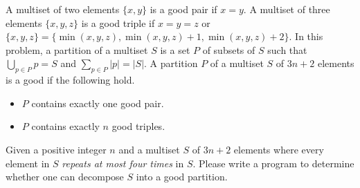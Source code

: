 A multiset of two elements $\{x, y\}$ is a good pair if $x=y$.
A multiset of three elements $\{x,y,z\}$ is a good triple 
if $x=y=z$ or $\{x,y,z\} = \{\min(x,y,z),\min(x,y,z)+1,\min(x,y,z)+2\}$.
In this problem, 
a partition of a multiset $S$ is a set $P$ of subsets of $S$ such that
$\bigcup_{p\in P}p = S$ and $\sum_{p\in P}|p| = |S|$.
A partition $P$ of a multiset $S$ of $3n+2$ elements is a good if 
the following hold.
\begin{itemize}
\item $P$ contains exactly one good pair.
\item $P$ contains exactly $n$ good triples.
\end{itemize}

Given a positive integer $n$ and a multiset $S$ of $3n+2$ elements where
every element in $S$ \emph{repeats at most four times} in $S$.
Please write a program to determine whether one can decompose $S$ 
into a good partition.
